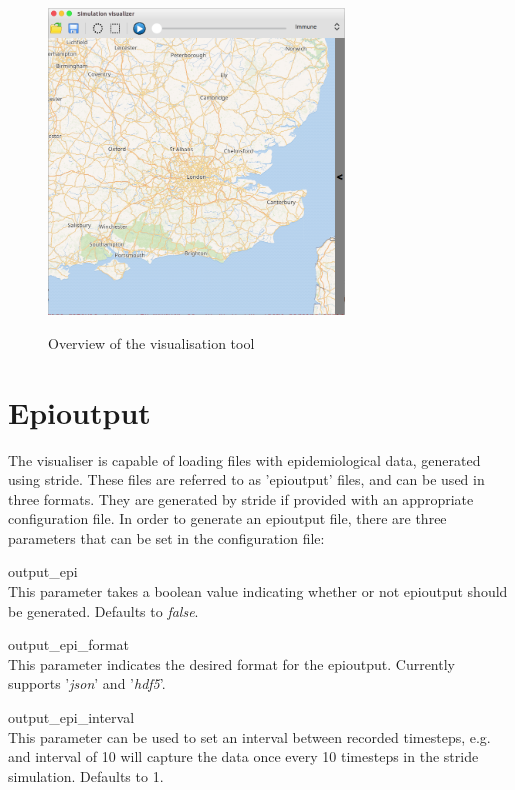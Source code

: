 \begin{figure}[H]
\centering
\includegraphics[width=0.7\textwidth,keepaspectratio]{images/overview.png}
\label{fig:screenshot_overview}
\caption{Overview of the visualisation tool}
\end{figure}

\section{Epioutput}
\label{section:epioutput}
The visualiser is capable of loading files with epidemiological data, generated using stride. These files are referred to as 'epioutput' files, and can be used in three formats. They are generated by stride if provided with an appropriate configuration file. In order to generate an epioutput file, there are three parameters that can be set in the configuration file:

\begin{compactdesc}
\item [output\_epi] \ \\
    This parameter takes a boolean value indicating whether or not epioutput should be generated. Defaults to \emph{false}.
\item [output\_epi\_format] \ \\
    This parameter indicates the desired format for the epioutput. Currently supports '\emph{json}' and '\emph{hdf5}'.
\item [output\_epi\_interval] \ \\
    This parameter can be used to set an interval between recorded timesteps, e.g. and interval of 10 will capture the data once every 10 timesteps in the stride simulation. Defaults to 1.
\end{compactdesc}

